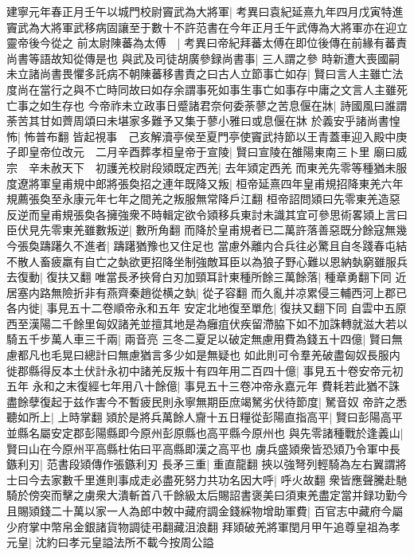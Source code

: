 建寧元年春正月壬午以城門校尉竇武為大將軍|{
	考異曰袁紀延熹九年四月戊寅特進竇武為大將軍武移病固讓至于數十不許范書在今年正月壬午武傳為大將軍亦在迎立靈帝後今從之}
前太尉陳蕃為太傅　|{
	考異曰帝紀拜蕃太傅在即位後傳在前緣有蕃責尚書等語故知從傳是也}
與武及司徒胡廣參録尚書事|{
	三人謂之參}
時新遭大喪國嗣未立諸尚書畏懼多託病不朝陳蕃移書責之曰古人立節事亡如存|{
	賢曰言人主雖亡法度尚在當行之與不亡時同故曰如存余謂事死如事生事亡如事存中庸之文言人主雖死亡事之如生存也}
今帝祚未立政事日蹙諸君奈何委荼蓼之苦息偃在牀|{
	詩國風曰誰謂荼苦其甘如薺周頌曰未堪家多難予又集于蓼小雅曰或息偃在牀}
於義安乎諸尚書惶怖|{
	怖普布翻}
皆起視事　己亥解瀆亭侯至夏門亭使竇武持節以王青蓋車迎入殿中庚子即皇帝位改元　二月辛酉葬孝桓皇帝于宣陵|{
	賢曰宣陵在雒陽東南三卜里}
廟曰威宗　辛未赦天下　初護羌校尉段熲既定西羌|{
	去年熲定西羌}
而東羌先零等種猶未服度遼將軍皇甫規中郎將張奐招之連年既降又叛|{
	桓帝延熹四年皇甫規招降東羌六年規薦張奐至永康元年七年之間羌之叛服無常降戶江翻}
桓帝詔問熲曰先零東羌造惡反逆而皇甫規張奐各擁強衆不時輯定欲令熲移兵東討未識其宜可參思術畧熲上言曰臣伏見先零東羌雖數叛逆|{
	數所角翻}
而降於皇甫規者已二萬許落善惡既分餘寇無幾今張奐躊躇久不進者|{
	躊躇猶豫也又住足也}
當慮外離内合兵往必驚且自冬踐春屯結不散人畜疲羸有自亡之埶欲更招降坐制強敵耳臣以為狼子野心難以恩納埶窮雖服兵去復動|{
	復扶又翻}
唯當長矛挾脅白刃加頸耳計東種所餘三萬餘落|{
	種章勇翻下同}
近居塞内路無險折非有燕齊秦趙從横之埶|{
	從子容翻}
而久亂并凉累侵三輔西河上郡已各内徙|{
	事見五十二卷順帝永和五年}
安定北地復至單危|{
	復扶又翻下同}
自雲中五原西至漢陽二千餘里匈奴諸羌並擅其地是為癰疽伏疾留滯脇下如不加誅轉就滋大若以騎五千步萬人車三千兩|{
	兩音亮}
三冬二夏足以破定無慮用費為錢五十四億|{
	賢曰無慮都凡也毛晃曰總計曰無慮猶言多少如是無疑也}
如此則可令羣羌破盡匈奴長服内徙郡縣得反本土伏計永初中諸羌反叛十有四年用二百四十億|{
	事見五十卷安帝元初五年}
永和之末復經七年用八十餘億|{
	事見五十三卷冲帝永嘉元年}
費耗若此猶不誅盡餘孽復起于兹作害今不暫疲民則永寧無期臣庶竭駑劣伏待節度|{
	駑音奴}
帝許之悉聽如所上|{
	上時掌翻}
熲於是將兵萬餘人齎十五日糧從彭陽直指高平|{
	賢曰彭陽高平並縣名屬安定郡彭陽縣即今原州彭原縣也高平縣今原州也}
與先零諸種戰於逢義山|{
	賢曰山在今原州平高縣杜佑曰平高縣即漢之高平也}
虜兵盛熲衆皆恐熲乃令軍中長鏃利刃|{
	范書段熲傳作張鏃利刃}
長矛三重|{
	重直龍翻}
挾以強弩列輕騎為左右翼謂將士曰今去家數千里進則事成走必盡死努力共功名因大呼|{
	呼火故翻}
衆皆應聲騰赴馳騎於傍突而擊之虜衆大潰斬首八千餘級太后賜詔書褒美曰須東羌盡定當并録功勤今且賜熲錢二十萬以家一人為郎中敇中藏府調金錢綵物增助軍費|{
	百官志中藏府今屬少府掌中幣帛金銀諸貨物調徒弔翻藏沮浪翻}
拜熲破羌將軍閏月甲午追尊皇祖為孝元皇|{
	沈約曰孝元皇謚法所不載今按周公謚}


